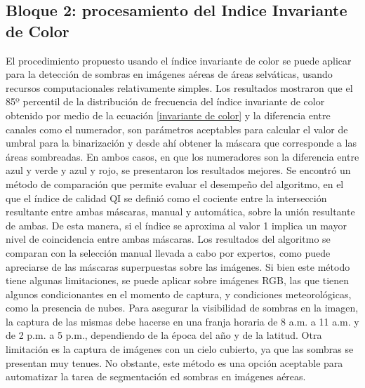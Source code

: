 \subsection{Bloque 2: procesamiento del Indice Invariante de Color} \label{Conclusiones}

El procedimiento propuesto usando el índice invariante de color se puede aplicar para la detección de sombras en imágenes aéreas de áreas selváticas, usando recursos computacionales relativamente simples. Los resultados mostraron que el 85º percentil de la distribución de frecuencia del índice invariante de color obtenido por medio de la ecuación \ref{invariante de color} y la diferencia entre canales como el numerador, son parámetros aceptables para calcular el valor de umbral para la binarización y desde ahí obtener la máscara que corresponde a las áreas sombreadas.
En ambos casos, en que los numeradores son la diferencia entre azul y verde y azul y rojo, se presentaron los resultados mejores. Se encontró un método de comparación que permite evaluar el desempeño del algoritmo, en el que el índice de calidad QI se definió como el cociente entre la intersección resultante entre ambas máscaras, manual y automática, sobre la unión resultante de ambas. De esta manera, si el índice se aproxima al valor 1 implica un mayor nivel de coincidencia entre ambas máscaras. Los resultados del algoritmo se comparan con la selección manual llevada a cabo por expertos, como puede apreciarse de las máscaras superpuestas sobre las imágenes. Si bien este método tiene algunas limitaciones, se puede aplicar sobre imágenes RGB, las que tienen algunos condicionantes en el momento de captura, y condiciones meteorológicas, como la presencia de nubes. Para asegurar la visibilidad de sombras en la imagen, la captura de las mismas debe hacerse en una franja horaria de 8 a.m. a 11 a.m. y de 2 p.m. a 5 p.m., dependiendo de la época del año y de la latitud. Otra limitación es la captura de imágenes con un cielo cubierto, ya que las sombras se presentan muy tenues. No obstante, este método es una opción aceptable para automatizar la tarea de segmentación ed sombras en imágenes aéreas.
